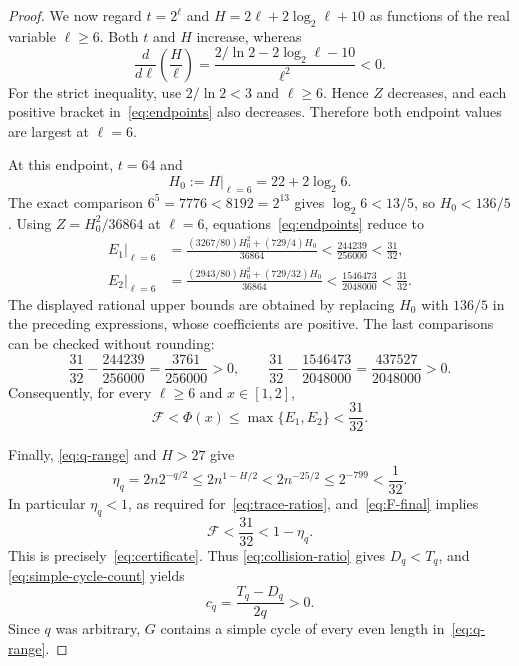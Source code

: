 \documentclass[11pt,a4paper]{article}
\begin{document}
\begin{proof}
We now regard $t=2^\ell$ and $H=2\ell+2\log_2\ell+10$ as functions
of the real variable $\ell\ge6$. Both $t$ and $H$ increase, whereas
\begin{equation}\label{eq:monotone}
 \frac{d}{d\ell}\left(\frac H\ell\right)
 =\frac{2/\ln2-2\log_2\ell-10}{\ell^2}<0.
\end{equation}
For the strict inequality, use $2/\ln2<3$ and $\ell\ge6$.
Hence $Z$ decreases, and each positive bracket
in~\eqref{eq:endpoints} also decreases. Therefore both endpoint
values are largest at $\ell=6$.

At this endpoint, $t=64$ and
\[
 H_0:=H\big|_{\ell=6}=22+2\log_2 6.
\]
The exact comparison $6^5=7776<8192=2^{13}$ gives
$\log_2 6<13/5$, so $H_0<136/5$.
Using $Z=H_0^2/36864$ at $\ell=6$, equations~\eqref{eq:endpoints}
reduce to
\begin{align}
 E_1\big|_{\ell=6}
 &=\frac{(3267/80)H_0^2+(729/4)H_0}{36864}
 <\frac{244239}{256000}<\frac{31}{32},
 \label{eq:endpoint-one}\\
 E_2\big|_{\ell=6}
 &=\frac{(2943/80)H_0^2+(729/32)H_0}{36864}
 <\frac{1546473}{2048000}<\frac{31}{32}.
 \label{eq:endpoint-two}
\end{align}
The displayed rational upper bounds are obtained by replacing $H_0$
with $136/5$ in the preceding expressions, whose coefficients are
positive. The last comparisons can be checked without rounding:
\[
 \frac{31}{32}-\frac{244239}{256000}
 =\frac{3761}{256000}>0,
 \qquad
 \frac{31}{32}-\frac{1546473}{2048000}
 =\frac{437527}{2048000}>0.
\]
Consequently, for every $\ell\ge6$ and $x\in[1,2]$,
\begin{equation}\label{eq:F-final}
 \mathcal F<\Phi(x)\le\max\{E_1,E_2\}<\frac{31}{32}.
\end{equation}

Finally, \eqref{eq:q-range} and $H>27$ give
\begin{equation}\label{eq:eta-final}
 \eta_q=2n2^{-q/2}
 \le2n^{1-H/2}
 <2n^{-25/2}
 \le2^{-799}
 <\frac1{32}.
\end{equation}
In particular $\eta_q<1$, as required for~\eqref{eq:trace-ratios},
and~\eqref{eq:F-final} implies
\[
 \mathcal F<\frac{31}{32}<1-\eta_q.
\]
This is precisely~\eqref{eq:certificate}. Thus
\eqref{eq:collision-ratio} gives $D_q<T_q$, and
\eqref{eq:simple-cycle-count} yields
\[
 c_q=\frac{T_q-D_q}{2q}>0.
\]
Since $q$ was arbitrary, $G$ contains a simple cycle of every even
length in~\eqref{eq:q-range}.
\end{proof}
\end{document}
